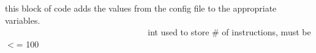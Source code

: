 this block of code adds the values from the config file to the appropriate variables. ~\newline
~\newline
~\newline
~\newline
~\newline
~\newline
~\newline
~\newline
~\newline
~\newline
~\newline
~\newline
~\newline
~\newline
~\newline
~\newline
~\newline
~\newline
~\newline
~\newline
~\newline
~\newline
~\newline
~\newline
~\newline
~\newline
~\newline
~\newline
~\newline
~\newline
~\newline
~\newline
~\newline
~\newline
~\newline
~\newline
~\newline
~\newline
~\newline
~\newline
~\newline
~\newline
~\newline
~\newline
~\newline
~\newline
~\newline
~\newline
~\newline
~\newline
~\newline
~\newline
~\newline
~\newline
~\newline
~\newline
~\newline
~\newline
 int used to store \# of instructions, must be $<$= 100


